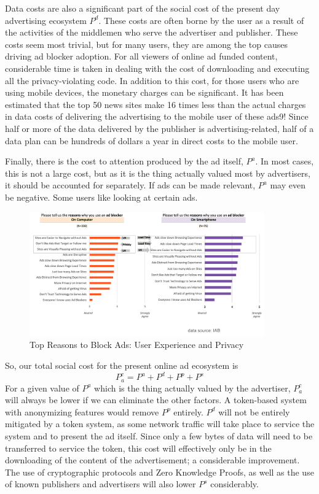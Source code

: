 \documentclass[11pt]{article}
\begin{document}
Data costs are also a significant part of the social cost of the
present day advertising ecosystem  $P^{d}$. These costs are often borne by the
user as a result of the activities of the middlemen who serve the
advertiser and publisher. These costs seem most trivial, but for many
users, they are among the top causes driving ad blocker adoption. For
all viewers of online ad funded content, considerable time is taken in
dealing with the cost of downloading and executing all the
privacy-violating code. In addition to this cost, for those users who
are using mobile devices, the monetary charges can be significant. It
has been estimated that the top 50 news sites make 16 times less than
the actual charges in data costs of delivering the advertising to the
mobile user of these ads9! Since half or more of the data delivered
by the publisher is advertising-related, half of a data plan can be
hundreds of dollars a year in direct costs to the mobile user. 

Finally, there is the cost to attention produced by the ad itself,
$P^{a}$. In most cases, this is not a large cost, but as it is the thing
actually valued most by advertisers, it should be accounted for
separately. If ads can be made relevant, $P^{a}$ may even be negative. Some
users like looking at certain ads.



\begin{figure}
\begin{center}
\includegraphics[width=0.9\textwidth]{topreasons_to_block.png}
\caption{Top Reasons to Block Ads: User Experience and Privacy }
\end{center}
\end{figure}





So, our total social cost for the present online ad ecosystem is 
 \[P^{c}_a = P^{a} + P^{d} + P^{p} + P^{s}\]
 For a given value of $P^{a}$ which is the thing actually valued by the
 advertiser, $P^{c}_a $ will always be lower if we can eliminate the other
 factors. A token-based system with anonymizing features would remove $P^{p}$
 entirely. $P^{d}$ will not be entirely mitigated by a token system, as some
 network traffic will take place to service the system and to present
 the ad itself. Since only a few bytes of data will need to be
 transferred to service the token, this cost will effectively only be
 in the downloading of the content of the advertisement; a
 considerable improvement. The use of cryptographic protocols and Zero
 Knowledge Proofs, as well as the use of known publishers and
 advertisers will also lower $P^{s}$ considerably.
\end{document}
